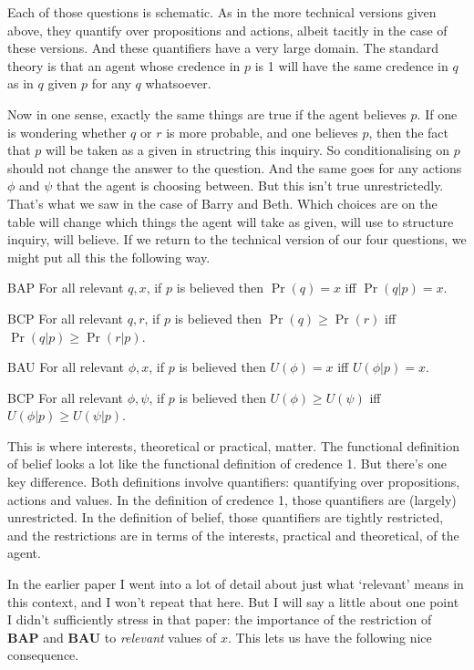 \noindent Each of those questions is schematic. As in the more technical versions given above, they quantify over propositions and actions, albeit tacitly in the case of these versions. And these quantifiers have a very large domain. The standard theory is that an agent whose credence in \(p\) is 1 will have the same credence in \(q\) as in \(q\) given \(p\) for any \(q\) whatsoever.

Now in one sense, exactly the same things are true if the agent believes \(p\). If one is wondering whether \(q\) or \(r\) is more probable, and one believes \(p\), then the fact that \(p\) will be taken as a given in structring this inquiry. So conditionalising on \(p\) should not change the answer to the question. And the same goes for any actions \(\phi\) and \(\psi\) that the agent is choosing between. But this isn't true unrestrictedly. That's what we saw in the case of Barry and Beth. Which choices are on the table will change which things the agent will take as given, will use to structure inquiry, will believe. If we return to the technical version of our four questions, we might put all this the following way.

\begin{description*}
\item[BAP] For all relevant \(q, x\), if \(p\) is believed then \(\Pr(q) = x\) iff \(\Pr(q | p) = x\).
\item[BCP] For all relevant \(q, r\), if \(p\) is believed then \(\Pr(q) \geq \Pr(r)\) iff \(\Pr(q | p) \geq \Pr(r | p)\).
\item[BAU] For all relevant \(\phi, x\), if \(p\) is believed then \(U(\phi) = x\) iff \(U(\phi | p) = x\).
\item[BCP] For all relevant \(\phi, \psi\), if \(p\) is believed then \(U(\phi) \geq U(\psi)\) iff \(U(\phi | p) \geq U(\psi | p)\).
\end{description*}

\noindent This is where interests, theoretical or practical, matter. The functional definition of belief looks a lot like the functional definition of credence 1. But there's one key difference. Both definitions involve quantifiers: quantifying over propositions, actions and values. In the definition of credence 1, those quantifiers are (largely) unrestricted. In the definition of belief, those quantifiers are tightly restricted, and the restrictions are in terms of the interests, practical and theoretical, of the agent.

In the earlier paper I went into a lot of detail about just what `relevant' means in this context, and I won't repeat that here. But I will say a little about one point I didn't sufficiently stress in that paper: the importance of the restriction of \textbf{BAP} and \textbf{BAU} to \textit{relevant} values of \(x\). This lets us have the following nice consequence.

